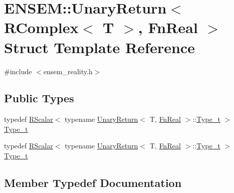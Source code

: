 \hypertarget{structENSEM_1_1UnaryReturn_3_01RComplex_3_01T_01_4_00_01FnReal_01_4}{}\section{E\+N\+S\+EM\+:\+:Unary\+Return$<$ R\+Complex$<$ T $>$, Fn\+Real $>$ Struct Template Reference}
\label{structENSEM_1_1UnaryReturn_3_01RComplex_3_01T_01_4_00_01FnReal_01_4}


{\ttfamily \#include $<$ensem\+\_\+reality.\+h$>$}

\subsection*{Public Types}
\begin{DoxyCompactItemize}
\item 
typedef \mbox{\hyperlink{classENSEM_1_1RScalar}{R\+Scalar}}$<$ typename \mbox{\hyperlink{structENSEM_1_1UnaryReturn}{Unary\+Return}}$<$ T, \mbox{\hyperlink{structENSEM_1_1FnReal}{Fn\+Real}} $>$\+::\mbox{\hyperlink{structENSEM_1_1UnaryReturn_3_01RComplex_3_01T_01_4_00_01FnReal_01_4_a2495b3d7e3cfcf3f84d7bbf892bbfd3c}{Type\+\_\+t}} $>$ \mbox{\hyperlink{structENSEM_1_1UnaryReturn_3_01RComplex_3_01T_01_4_00_01FnReal_01_4_a2495b3d7e3cfcf3f84d7bbf892bbfd3c}{Type\+\_\+t}}
\item 
typedef \mbox{\hyperlink{classENSEM_1_1RScalar}{R\+Scalar}}$<$ typename \mbox{\hyperlink{structENSEM_1_1UnaryReturn}{Unary\+Return}}$<$ T, \mbox{\hyperlink{structENSEM_1_1FnReal}{Fn\+Real}} $>$\+::\mbox{\hyperlink{structENSEM_1_1UnaryReturn_3_01RComplex_3_01T_01_4_00_01FnReal_01_4_a2495b3d7e3cfcf3f84d7bbf892bbfd3c}{Type\+\_\+t}} $>$ \mbox{\hyperlink{structENSEM_1_1UnaryReturn_3_01RComplex_3_01T_01_4_00_01FnReal_01_4_a2495b3d7e3cfcf3f84d7bbf892bbfd3c}{Type\+\_\+t}}
\end{DoxyCompactItemize}


\subsection{Member Typedef Documentation}
\mbox{\label{structENSEM_1_1UnaryReturn_3_01RComplex_3_01T_01_4_00_01FnReal_01_4_a2495b3d7e3cfcf3f84d7bbf892bbfd3c}} 
